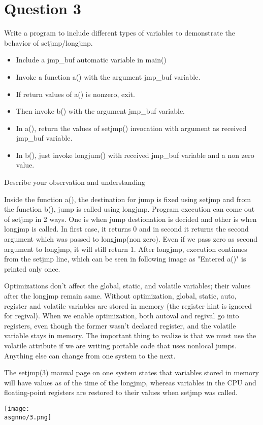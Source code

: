 \documentclass[main.tex]{subfiles}
\begin{document}
\section{Question 3}

Write a program to include different types of variables to demonstrate the
behavior of setjmp/longjmp.

\begin{itemize}
\item Include a jmp\_buf automatic variable in main()
\item Invoke a function a() with the argument jmp\_buf variable.
\item If return values of a() is nonzero, exit.
\item Then invoke b() with the argument jmp\_buf variable.
\item In a(), return the values of setjmp() invocation with argument as received
jmp\_buf  variable.
\item In b(), just invoke longjum() with  received jmp\_buf  variable and a non zero
value.
\end{itemize}

Describe your observation and understanding



Inside the function a(), the destination for jump is fixed using setjmp and from
the function b(), jump is called using longjmp. Program execution can come out
of setjmp in 2 ways. One is when jump destionation is decided and other is when
longjmp is called. In first case, it returns 0 and in second it returns the
second argument which was passed to longjmp(non zero). Even if we pass zero as
second argument to longjmp, it will still return 1. After longjmp, execution
continues from the setjmp line, which can be seen in following image as "Entered
a()" is printed only once.

Optimizations don’t affect the global, static, and volatile variables; their
values after the longjmp remain same. Without optimization, global, static,
auto, register and volatile variables are stored in memory (the register hint is
ignored for regival). When we enable optimization, both autoval and regival go
into registers, even though the former wasn’t declared register, and the
volatile variable stays in memory. The important thing to realize is that we
must use the volatile attribute if we are writing portable code that uses
nonlocal jumps. Anything else can change from one system to the next.

The setjmp(3) manual page on one system states that variables stored in memory
will have values as of the time of the longjmp, whereas variables in the CPU and
floating-point registers are restored to their values when setjmp was called.

\centering\texttt{[image: \\asgnno/3.png]}
\clearpage
\end{document}
